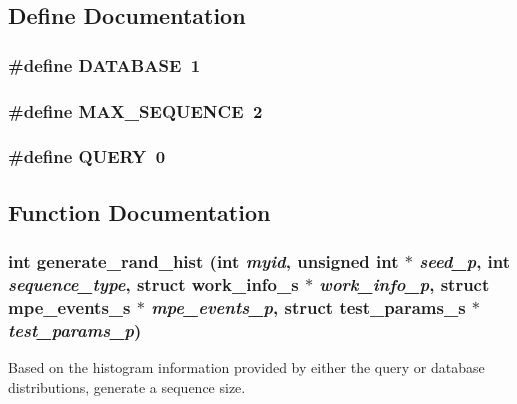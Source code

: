 \subsection{Define Documentation}
\subsubsection{\setlength{\rightskip}{0pt plus 5cm}\#define DATABASE~1}\label{hist__params_8h_39dc88d73783e112dbfcf98adbdbefa6}


\subsubsection{\setlength{\rightskip}{0pt plus 5cm}\#define MAX\_\-SEQUENCE~2}\label{hist__params_8h_6f1542da1910029eef71bd43c81e7542}


\subsubsection{\setlength{\rightskip}{0pt plus 5cm}\#define QUERY~0}\label{hist__params_8h_e5ff1f63e632fba61c45cfb0a2b19066}




\subsection{Function Documentation}
\subsubsection{\setlength{\rightskip}{0pt plus 5cm}int generate\_\-rand\_\-hist (int {\em myid}, unsigned int $\ast$ {\em seed\_\-p}, int {\em sequence\_\-type}, struct \bf{work\_\-info\_\-s} $\ast$ {\em work\_\-info\_\-p}, struct \bf{mpe\_\-events\_\-s} $\ast$ {\em mpe\_\-events\_\-p}, struct \bf{test\_\-params\_\-s} $\ast$ {\em test\_\-params\_\-p})}\label{hist__params_8h_c635ab29585dee9b74c4b7b21055d05b}


Based on the histogram information provided by either the query or database distributions, generate a sequence size.

